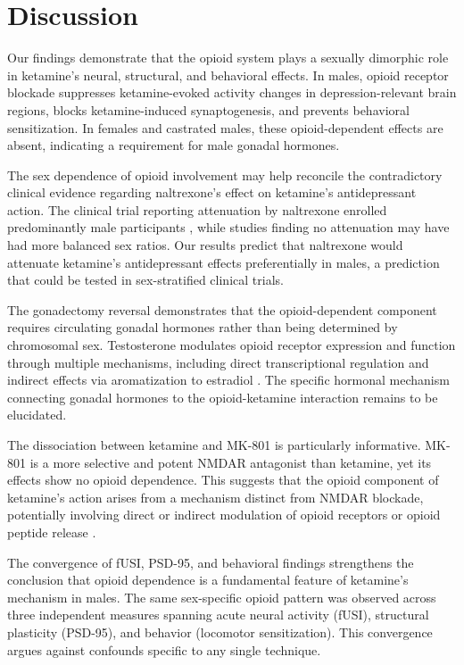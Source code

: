 \documentclass[11pt]{article}
\begin{document}
\section{Discussion}

Our findings demonstrate that the opioid system plays a sexually dimorphic role in ketamine's neural, structural, and behavioral effects. In males, opioid receptor blockade suppresses ketamine-evoked activity changes in depression-relevant brain regions, blocks ketamine-induced synaptogenesis, and prevents behavioral sensitization. In females and castrated males, these opioid-dependent effects are absent, indicating a requirement for male gonadal hormones.

The sex dependence of opioid involvement may help reconcile the contradictory clinical evidence regarding naltrexone's effect on ketamine's antidepressant action. The clinical trial reporting attenuation by naltrexone enrolled predominantly male participants \citep{williams2018}, while studies finding no attenuation may have had more balanced sex ratios. Our results predict that naltrexone would attenuate ketamine's antidepressant effects preferentially in males, a prediction that could be tested in sex-stratified clinical trials.

The gonadectomy reversal demonstrates that the opioid-dependent component requires circulating gonadal hormones rather than being determined by chromosomal sex. Testosterone modulates opioid receptor expression and function through multiple mechanisms, including direct transcriptional regulation and indirect effects via aromatization to estradiol \citep{craft2004}. The specific hormonal mechanism connecting gonadal hormones to the opioid-ketamine interaction remains to be elucidated.

The dissociation between ketamine and MK-801 is particularly informative. MK-801 is a more selective and potent NMDAR antagonist than ketamine, yet its effects show no opioid dependence. This suggests that the opioid component of ketamine's action arises from a mechanism distinct from NMDAR blockade, potentially involving direct or indirect modulation of opioid receptors or opioid peptide release \citep{gupta2011,bhatt2020}.

The convergence of fUSI, PSD-95, and behavioral findings strengthens the conclusion that opioid dependence is a fundamental feature of ketamine's mechanism in males. The same sex-specific opioid pattern was observed across three independent measures spanning acute neural activity (fUSI), structural plasticity (PSD-95), and behavior (locomotor sensitization). This convergence argues against confounds specific to any single technique.
\end{document}
